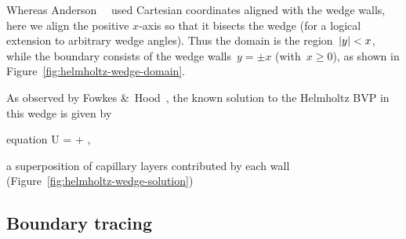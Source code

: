 Whereas Anderson~\etal~\cite{anderson-2007-boundary-tracing-ii-applications}
used Cartesian coordinates aligned with the wedge walls,
here we align the positive $x$-axis so that it bisects the wedge
(for a logical extension to arbitrary wedge angles).
Thus the domain is the region~$\lvert y\rvert < x$,
while the boundary consists of the wedge walls~$y = \pm x$ (with~$x \ge 0$),
as shown in Figure~\ref{fig:helmholtz-wedge-domain}.

As observed by Fowkes \&~Hood~\cite{fowkes-1998-surface-tension-effects-wedge},
the known solution to the Helmholtz BVP in this wedge is given by
\begin{important}{equation}
  U =
    \exp {}
      +
    \exp {},
  \label{eq:scaled-helmholtz-solution}
\end{important}
a superposition of capillary layers contributed by each wall
(Figure~\ref{fig:helmholtz-wedge-solution})

\subsection{Boundary tracing}
\label{sec:moderate.linearised.tracing}

